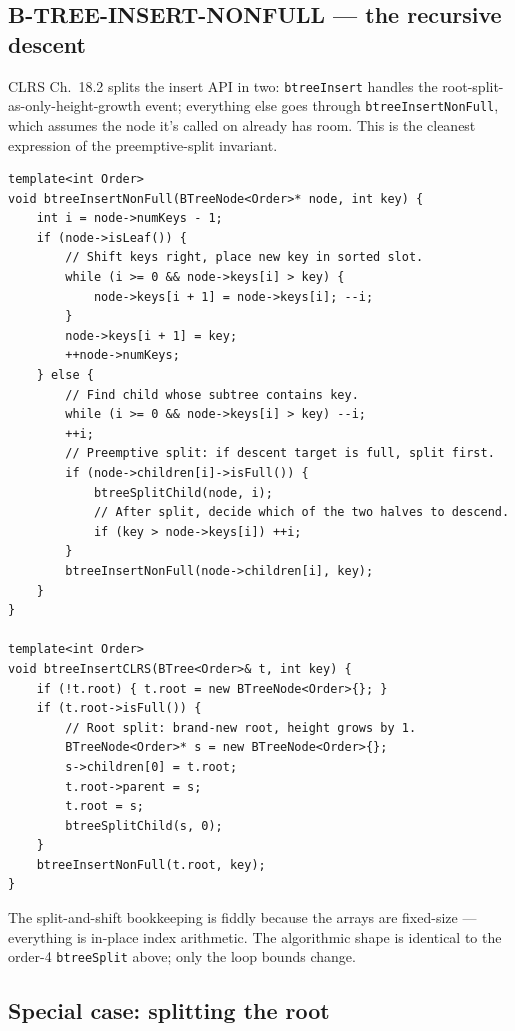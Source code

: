 \documentclass[11pt]{article}
\begin{document}
\subsection*{B-TREE-INSERT-NONFULL --- the recursive descent}

CLRS Ch.~18.2 splits the insert API in two: \texttt{btreeInsert}
handles the root-split-as-only-height-growth event; everything else
goes through \texttt{btreeInsertNonFull}, which assumes the node it's
called on already has room. This is the cleanest expression of the
preemptive-split invariant.

\begin{lstlisting}[basicstyle=\ttfamily\small,frame=single]
template<int Order>
void btreeInsertNonFull(BTreeNode<Order>* node, int key) {
    int i = node->numKeys - 1;
    if (node->isLeaf()) {
        // Shift keys right, place new key in sorted slot.
        while (i >= 0 && node->keys[i] > key) {
            node->keys[i + 1] = node->keys[i]; --i;
        }
        node->keys[i + 1] = key;
        ++node->numKeys;
    } else {
        // Find child whose subtree contains key.
        while (i >= 0 && node->keys[i] > key) --i;
        ++i;
        // Preemptive split: if descent target is full, split first.
        if (node->children[i]->isFull()) {
            btreeSplitChild(node, i);
            // After split, decide which of the two halves to descend.
            if (key > node->keys[i]) ++i;
        }
        btreeInsertNonFull(node->children[i], key);
    }
}

template<int Order>
void btreeInsertCLRS(BTree<Order>& t, int key) {
    if (!t.root) { t.root = new BTreeNode<Order>{}; }
    if (t.root->isFull()) {
        // Root split: brand-new root, height grows by 1.
        BTreeNode<Order>* s = new BTreeNode<Order>{};
        s->children[0] = t.root;
        t.root->parent = s;
        t.root = s;
        btreeSplitChild(s, 0);
    }
    btreeInsertNonFull(t.root, key);
}
\end{lstlisting}

\noindent The split-and-shift bookkeeping is fiddly because the
arrays are fixed-size --- everything is in-place index arithmetic.
The algorithmic shape is identical to the order-4 \texttt{btreeSplit}
above; only the loop bounds change.

\subsection*{Special case: splitting the root}
\end{document}
